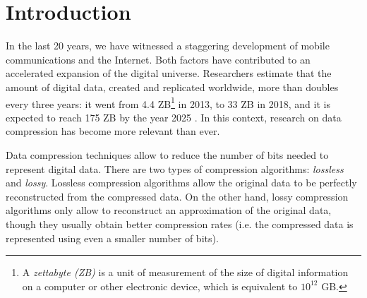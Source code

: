 
\chapter{Introduction} %
\label{intro:intro} %


\newcommand{\maxerror}{\textit{$\epsilon$}\xspace}
\newcommand{\alOne}{a_1}
\newcommand{\alTwo}{a_2}
\newcommand{\RD}{\textnormal{RD}}
\newcommand{\MaskVar}[1]{$\text{{#1}}_\textit{M}$}
\newcommand{\NonMaskVar}[1]{$\text{{#1}}_\textit{NM}$}

\newcommand{\zetafoot}{\footnote{A \textit{zettabyte (ZB)} is a unit of measurement of the size of digital information on a computer or other electronic device, which is equivalent to $10^{12}$ GB.} }


In the last 20 years, we have witnessed a staggering development of mobile communications and the Internet. Both factors have contributed to an accelerated expansion of the digital universe. Researchers estimate that the amount of digital data, created and replicated worldwide, more than doubles every three years: it went from 4.4 ZB\zetafoot in 2013, to 33 ZB in 2018, and it is expected to reach 175 ZB by the year 2025 \cite{Digitalization1, Digitalization2}. In this context, research on data compression has become more relevant than ever.


Data compression techniques allow to reduce the number of bits needed to represent digital data. There are two types of compression algorithms: \textit{lossless} and \textit{lossy}. Lossless compression algorithms allow the original data to be perfectly reconstructed from the compressed data. On the other hand, lossy compression algorithms only allow to reconstruct an approximation of the original data, though they usually obtain better compression rates (i.e. the compressed data is represented using even a smaller number of bits).



